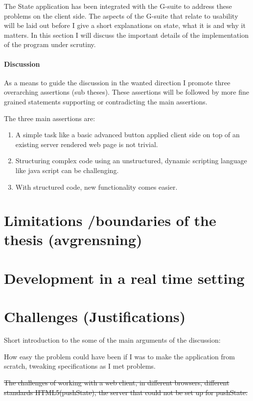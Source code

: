 \documentclass[english]{ifimaster}
\begin{document}
The State application has been integrated with the G-suite to address these problems on the client side. The aspects of the G-suite that relate to usability will be laid out before I give a short explanations on state, what it is and why it matters. 
In this section I will discuss the important details of the implementation of the program under scrutiny. 

\paragraph{Discussion}
As a means to guide the discussion in the wanted direction I promote three overarching assertions (sub theses). These assertions will be followed by more fine grained statements supporting or contradicting the main assertions. 

The three main assertions are:
\begin{enumerate}
  \item A simple task like a basic advanced button applied client side on top of an existing server rendered web page is not trivial.
  \item Structuring complex code using an unstructured, dynamic scripting language like java script can be challenging.
  \item With structured code, new functionality comes easier. 
\end{enumerate}

\section{Limitations /boundaries of the thesis (avgrensning)}

\section{Development in a real time setting}


\section{Challenges (Justifications)}
Short introduction to the some of the main arguments of the discussion: 

How easy the problem could have been if I was to make the application from scratch, tweaking specifications as I met problems.

\sout{The challenges of working with a web client, in different browsers, different standards HTML5(pushState), the server that could not be set up for pushState.}
\end{document}
